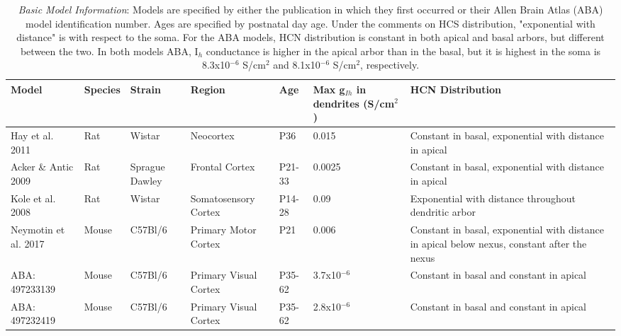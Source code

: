 \documentclass[utf8]{frontiersSCNS} %
\begin{document}
\begin{table}[h!]
\begin{center}
    \begin{tabular}{m{2cm}|m{1.25cm}|m{2cm}|m{2.5cm}|m{1cm}|m{2cm}|m{3.75cm}}
        \hline
        \textbf{Model} & \textbf{Species} & \textbf{Strain} & \textbf{Region} & \textbf{Age} & \textbf{Max g$_{Ih}$ in dendrites (S/cm$^2$)} & \textbf{HCN Distribution}  \\
        \hline
        Hay et al. 2011 & Rat & Wistar & Neocortex & P36 & 0.015 & Constant in basal, exponential with distance in  apical\\
        \hline
        Acker \& Antic 2009 & Rat & Sprague Dawley & Frontal Cortex & P21-33 & 0.0025 & Constant in basal, exponential with distance in  apical\\
        \hline
        Kole et al. 2008 & Rat & Wistar & Somatosensory Cortex & P14-28 & 0.09 & Exponential with distance throughout dendritic arbor\\
        \hline
        Neymotin et al. 2017 & Mouse & C57Bl/6 & Primary Motor Cortex & P21 & 0.006 & Constant in basal, exponential with distance in  apical
        below nexus, constant after the nexus\\
        \hline
        ABA: 497233139 & Mouse & C57Bl/6 & Primary Visual Cortex & P35-62 & 3.7x10$^{-6}$
        & Constant in basal and constant in apical\\
        \hline
        ABA: 497232419 & Mouse & C57Bl/6 & Primary Visual Cortex & P35-62 & 2.8x10$^{-6}$
        & Constant in basal and constant in apical\\
        \hline
    \end{tabular}
\end{center}
\caption{\emph{Basic Model Information}: Models are specified by either the publication in which they first occurred or their Allen Brain Atlas 
(ABA) model identification number.  Ages are specified by postnatal day age. Under the comments on HCS distribution, "exponential with distance"
is with  respect to the soma.  For the ABA models, HCN distribution is constant in both apical and basal arbors, but different between the two.
In both models ABA, I$_h$ conductance is higher in the apical arbor than in the basal, but it is highest in the soma is 8.3x10$^{-6}$ S/cm$^2$ and 
8.1x10$^{-6}$ S/cm$^2$, respectively.}
\label{Table 1}
\end{table}
\end{document}
